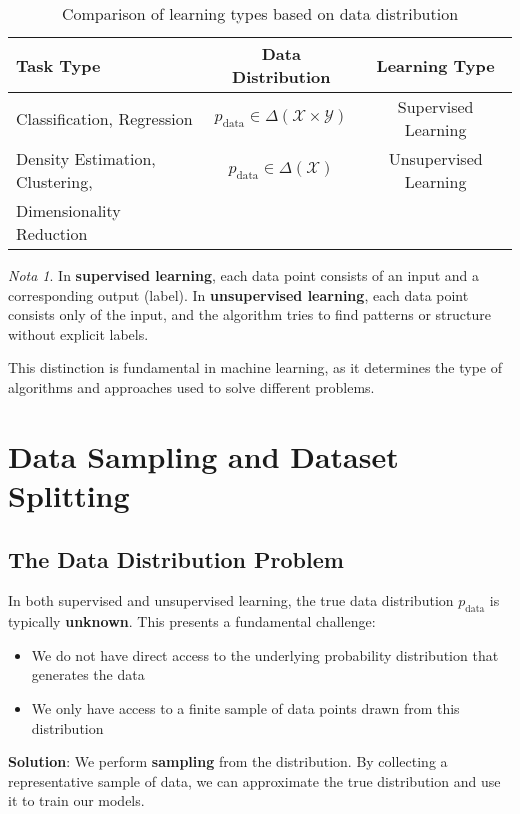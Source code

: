 \documentclass[11pt,a4paper]{article}
\theoremstyle{definition}
\theoremstyle{plain}
\theoremstyle{remark}
\newtheorem*{remark}{Nota}
\begin{document}
\begin{table}[h]
\centering
\begin{tabular}{|l|c|c|}
\hline
\textbf{Task Type} & \textbf{Data Distribution} & \textbf{Learning Type} \\
\hline
Classification, Regression & $p_{\text{data}} \in \Delta(\mathcal{X} \times \mathcal{Y})$ & Supervised Learning \\
\hline
Density Estimation, Clustering, & $p_{\text{data}} \in \Delta(\mathcal{X})$ & Unsupervised Learning \\
Dimensionality Reduction & & \\
\hline
\end{tabular}
\caption{Comparison of learning types based on data distribution}
\end{table}

\begin{remark}
In \textbf{supervised learning}, each data point consists of an input and a corresponding output (label). In \textbf{unsupervised learning}, each data point consists only of the input, and the algorithm tries to find patterns or structure without explicit labels.

This distinction is fundamental in machine learning, as it determines the type of algorithms and approaches used to solve different problems.
\end{remark}

\section{Data Sampling and Dataset Splitting}

\subsection{The Data Distribution Problem}

In both supervised and unsupervised learning, the true data distribution $p_{\text{data}}$ is typically \textbf{unknown}. This presents a fundamental challenge:
\begin{itemize}
    \item We do not have direct access to the underlying probability distribution that generates the data
    \item We only have access to a finite sample of data points drawn from this distribution
\end{itemize}

\textbf{Solution}: We perform \textbf{sampling} from the distribution. By collecting a representative sample of data, we can approximate the true distribution and use it to train our models.
\end{document}
